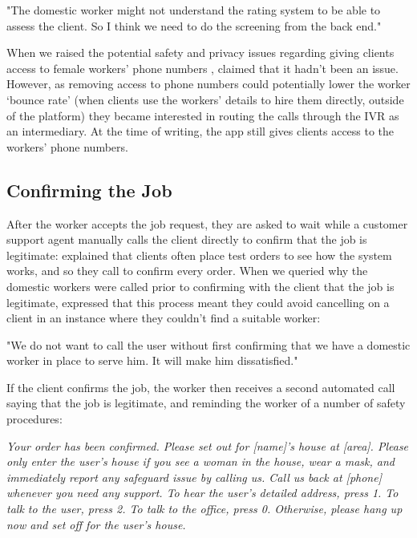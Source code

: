 \begin{displayquote}
"The domestic worker might not understand the rating system to be able to assess the client. So I think we need to do the screening from the back end."
\end{displayquote}

When we raised the potential safety and privacy issues regarding giving clients access to female workers' phone numbers \cite{Sambasivan2019}, \PC{} claimed that it hadn't been an issue. However, as removing access to phone numbers could potentially lower the worker `bounce rate' (when clients use the workers' details to hire them directly, outside of the \PC{} platform) they became interested in routing the calls through the IVR as an intermediary. At the time of writing, the \PC{} app still gives clients access to the workers' phone numbers. 

\subsection{Confirming the Job}

After the worker accepts the job request, they are asked to wait while a \PC{} customer support agent manually calls the client directly to confirm that the job is legitimate: \PC{} explained that clients often place test orders to see how the system works, and so they call to confirm every order. When we queried why the domestic workers were called prior to confirming with the client that the job is legitimate, \PC{} expressed that this process meant they could avoid cancelling on a client in an instance where they couldn't find a suitable worker:

\begin{displayquote}
"We do not want to call the user without first confirming that we have a domestic worker in place to serve him. It will make him dissatisfied." 
\end{displayquote}

If the client confirms the job, the worker then receives a second automated call saying that the job is legitimate, and reminding the worker of a number of safety procedures: 

\begin{displayquote}
\textit{Your order has been confirmed. Please set out for [name]’s house at [area]. Please only enter the user’s house if you see a woman in the house, wear a mask, and immediately report any safeguard issue by calling us. Call us back at [phone] whenever you need any support. To hear the user's detailed address, press 1. To talk to the user, press 2. To talk to the office, press 0. Otherwise, please hang up now and set off for the user’s house.}
\end{displayquote}

